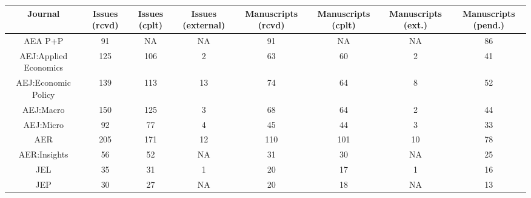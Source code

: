 
\begin{tabular}{@{\extracolsep{5pt}} cccccccc} 
\toprule 
Journal & Issues (rcvd) & Issues (cplt) & Issues (external) & Manuscripts (rcvd) & Manuscripts (cplt) & Manuscripts (ext.) & Manuscripts (pend.) \\ 
\midrule AEA P+P & 91 & NA & NA & 91 & NA & NA & 86 \\ 
AEJ:Applied Economics & 125 & 106 & 2 & 63 & 60 & 2 & 41 \\ 
AEJ:Economic Policy & 139 & 113 & 13 & 74 & 64 & 8 & 52 \\ 
AEJ:Macro & 150 & 125 & 3 & 68 & 64 & 2 & 44 \\ 
AEJ:Micro & 92 & 77 & 4 & 45 & 44 & 3 & 33 \\ 
AER & 205 & 171 & 12 & 110 & 101 & 10 & 78 \\ 
AER:Insights & 56 & 52 & NA & 31 & 30 & NA & 25 \\ 
JEL & 35 & 31 & 1 & 20 & 17 & 1 & 16 \\ 
JEP & 30 & 27 & NA & 20 & 18 & NA & 13 \\ 
\bottomrule 
\end{tabular} 
